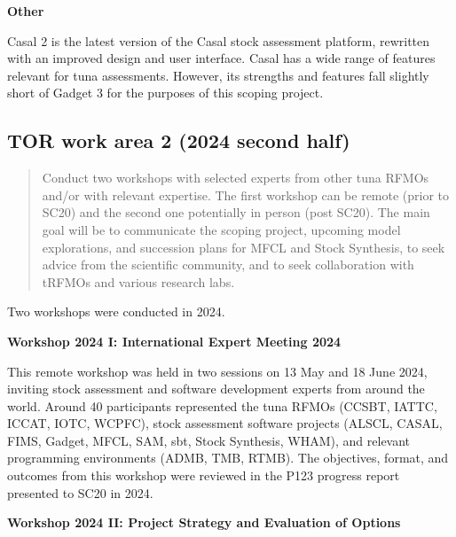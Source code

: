 \documentclass{SCreport}
\begin{document}
\textbf{Other}

\vspace{-1ex}

Casal 2 is the latest version of the Casal stock assessment platform, rewritten
with an improved design and user interface. Casal has a wide range of features
relevant for tuna assessments. However, its strengths and features fall slightly
short of Gadget 3 for the purposes of this scoping project.

\vspace{1ex}

\subsection{TOR work area 2 (2024 second half)}

\begin{quote}\sf
  Conduct two workshops with selected experts from other tuna RFMOs and/or with
  relevant expertise. The first workshop can be remote (prior to SC20) and the
  second one potentially in person (post SC20). The main goal will be to
  communicate the scoping project, upcoming model explorations, and succession
  plans for MFCL and Stock Synthesis, to seek advice from the scientific
  community, and to seek collaboration with tRFMOs and various research labs.
\end{quote}

\vspace{1ex}

Two workshops were conducted in 2024.

\vspace{1ex}

\textbf{Workshop 2024 I: International Expert Meeting 2024}

This remote workshop was held in two sessions on 13 May and 18 June 2024,
inviting stock assessment and software development experts from around the
world. Around 40 participants represented the tuna RFMOs (CCSBT, IATTC, ICCAT,
IOTC, WCPFC), stock assessment software projects (ALSCL, CASAL, FIMS, Gadget,
MFCL, SAM, sbt, Stock Synthesis, WHAM), and relevant programming environments
(ADMB, TMB, RTMB). The objectives, format, and outcomes from this workshop were
reviewed in the P123 progress report presented to SC20 in 2024.

\vspace{1ex}

\textbf{Workshop 2024 II: Project Strategy and Evaluation of Options}

\vspace{1ex}
\end{document}
